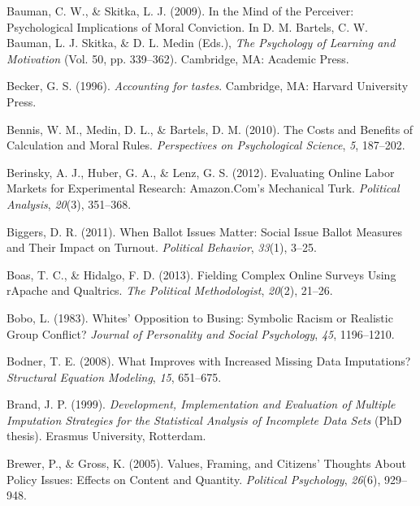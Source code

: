 \documentclass[12pt,econ]{sources/authesis}
\begin{document}
\leavevmode\hypertarget{ref-bauman_2009_mind}{}%
Bauman, C. W., \& Skitka, L. J. (2009). In the Mind of the Perceiver: Psychological Implications of Moral Conviction. In D. M. Bartels, C. W. Bauman, L. J. Skitka, \& D. L. Medin (Eds.), \emph{The Psychology of Learning and Motivation} (Vol. 50, pp. 339--362). Cambridge, MA: Academic Press.

\leavevmode\hypertarget{ref-becker_1996_accounting}{}%
Becker, G. S. (1996). \emph{Accounting for tastes}. Cambridge, MA: Harvard University Press.

\leavevmode\hypertarget{ref-bennis_costs_2010}{}%
Bennis, W. M., Medin, D. L., \& Bartels, D. M. (2010). The Costs and Benefits of Calculation and Moral Rules. \emph{Perspectives on Psychological Science}, \emph{5}, 187--202.

\leavevmode\hypertarget{ref-berinsky_evaluating_2012}{}%
Berinsky, A. J., Huber, G. A., \& Lenz, G. S. (2012). Evaluating Online Labor Markets for Experimental Research: Amazon.Com's Mechanical Turk. \emph{Political Analysis}, \emph{20}(3), 351--368.

\leavevmode\hypertarget{ref-biggers_2011_when}{}%
Biggers, D. R. (2011). When Ballot Issues Matter: Social Issue Ballot Measures and Their Impact on Turnout. \emph{Political Behavior}, \emph{33}(1), 3--25.

\leavevmode\hypertarget{ref-boas_fielding_2013}{}%
Boas, T. C., \& Hidalgo, F. D. (2013). Fielding Complex Online Surveys Using rApache and Qualtrics. \emph{The Political Methodologist}, \emph{20}(2), 21--26.

\leavevmode\hypertarget{ref-bobo_whites_1983}{}%
Bobo, L. (1983). Whites' Opposition to Busing: Symbolic Racism or Realistic Group Conflict? \emph{Journal of Personality and Social Psychology}, \emph{45}, 1196--1210.

\leavevmode\hypertarget{ref-bodner_2008_what}{}%
Bodner, T. E. (2008). What Improves with Increased Missing Data Imputations? \emph{Structural Equation Modeling}, \emph{15}, 651--675.

\leavevmode\hypertarget{ref-brand_1999_development}{}%
Brand, J. P. (1999). \emph{Development, Implementation and Evaluation of Multiple Imputation Strategies for the Statistical Analysis of Incomplete Data Sets} (PhD thesis). Erasmus University, Rotterdam.

\leavevmode\hypertarget{ref-brewer_values_2005}{}%
Brewer, P., \& Gross, K. (2005). Values, Framing, and Citizens' Thoughts About Policy Issues: Effects on Content and Quantity. \emph{Political Psychology}, \emph{26}(6), 929--948.
\end{document}

